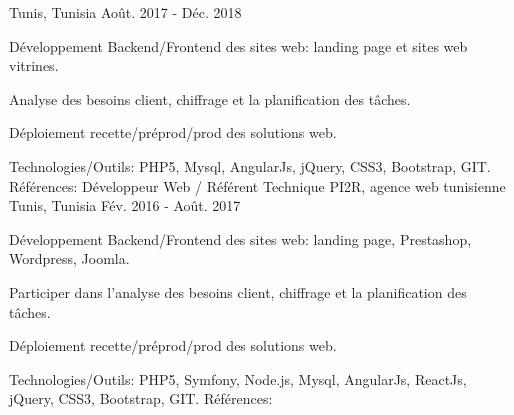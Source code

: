 \begin{cventries}
    {Tunis, Tunisia}
    {Août. 2017 - Déc. 2018}
    {
      \begin{cvitems}
        \item {Développement Backend/Frontend des sites web: landing page et sites web vitrines.}
        \item {Analyse des besoins client, chiffrage et la planification des tâches.}
        \item {Déploiement recette/préprod/prod des solutions web.}
      \end{cvitems}
    }
    {\textcolor{awesome}{Technologies/Outils: } {\color{graytext}}  {PHP5, Mysql, AngularJs, jQuery, CSS3, Bootstrap, GIT.}}
    {Références:} 
    {\href{http://www.cooperons.com/}{} \break
    \href{http://www.tisc.tn/ }{} \break
    }
  \techentries
    {Développeur Web / Référent Technique}
    {PI2R, agence web tunisienne}
    {Tunis, Tunisia}
    {Fév. 2016 - Août. 2017}
    {
      \begin{cvitems}
        \item {Développement Backend/Frontend des sites web: landing page, Prestashop, Wordpress, Joomla.}
        \item {Participer dans l'analyse des besoins client, chiffrage et la planification des tâches.}
        \item {Déploiement recette/préprod/prod des solutions web.}
      \end{cvitems}
    }
    {\textcolor{awesome}{Technologies/Outils: } {\color{graytext}}  {PHP5, Symfony, Node.js, Mysql, AngularJs, ReactJs, jQuery, CSS3, Bootstrap, GIT.}}
    {Références:} 
    {
      \href{http://www.tuttosport.tn/}{} \break
      \href{http://www.milddream.com/fr/ }{} \break
      \href{https://www.tvsoftconsult.com/ }{} \break
      \href{http://www.ordre-medecins.org.tn/fr/ }{} \break
      \href{http://orthodontiste-narimen-djerbi.com/ }{} \break
}
\end{cventries}
